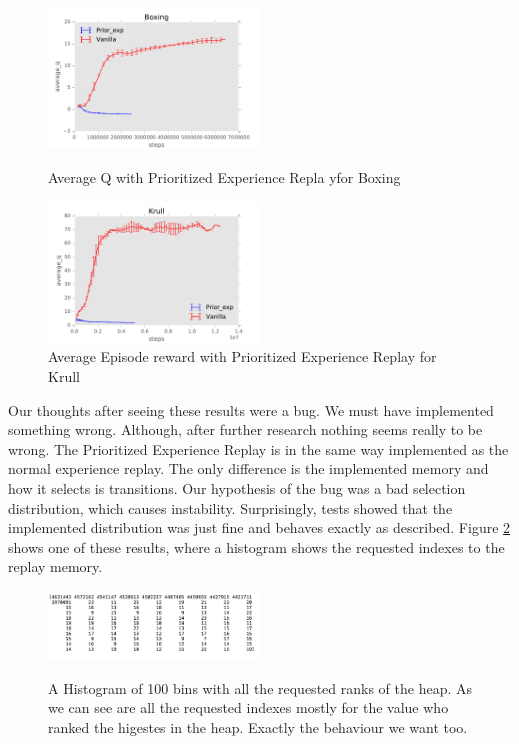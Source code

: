 \documentclass{sig-alternate}
\begin{document}
\begin{figure}[h!]
    \centering
    \includegraphics[width=0.5\textwidth]{../results/Boxing/Comparisons/Prior_exp/Prior_exp-baseline-average_q.pdf}
    \label{average q prior exp}
    \caption{Average Q with Prioritized Experience Repla yfor Boxing}
\end{figure}

\begin{figure}[h!]
    \centering
    \includegraphics[width=0.5\textwidth]{../results/Krull/Comparisons/Prior_exp/Prior_exp-baseline-average_q.pdf}
    \caption{Average Episode reward with Prioritized Experience Replay for Krull}
\end{figure}

Our thoughts after seeing these results were a bug. We must have implemented something wrong. Although, after further research nothing seems really to be wrong. The Prioritized Experience Replay is in the same way implemented as the normal experience replay. The only difference is the implemented memory and how it selects is transitions. Our hypothesis of the bug was a bad selection distribution, which causes instability. Surprisingly, tests showed that the implemented distribution was just fine and behaves exactly as described. Figure \ref{hist} shows one of these results, where a histogram shows the requested indexes to the replay memory.


\begin{figure}[h!]
    \centering
    \includegraphics[width=0.5\textwidth]{../results/hist_100.png}
    \label{hist}
    \caption{A Histogram of 100 bins with all the requested ranks of the heap. As we can see are all the requested indexes mostly for the value who ranked the higestes in the heap. Exactly the behaviour we want too.}
\end{figure}
\end{document}
